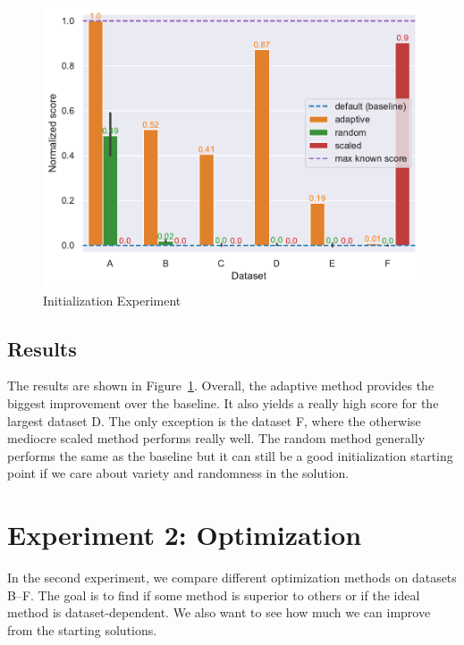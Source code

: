 \begin{figure}
    \centering
    \includegraphics[width=\linewidth]{img/experiments/init_experiment.pdf}
    \caption[Initialization Experiment]{
        Initialization Experiment
    }
    \label{fig:init_experiment}
\end{figure}

\subsection*{Results}

The results are shown in Figure~\ref{fig:init_experiment}. Overall, the adaptive method provides the biggest improvement over the baseline. It also yields a really high score for the largest dataset D. The only exception is the dataset F, where the otherwise mediocre scaled method performs really well. The random method generally performs the same as the baseline but it can still be a good initialization starting point if we care about variety and randomness in the solution. 

\section{Experiment 2: Optimization}

In the second experiment, we compare different optimization methods on datasets B--F. The goal is to find if some method is superior to others or if the ideal method is dataset-dependent. We also want to see how much we can improve from the starting solutions.

